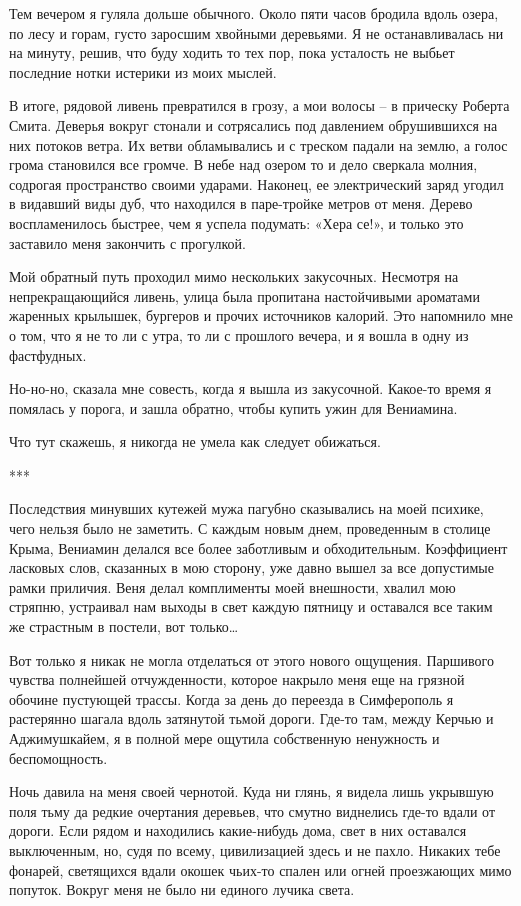 \documentclass[
]{book}
\begin{document}
Тем вечером я гуляла дольше обычного. Около пяти часов бродила вдоль озера, по лесу и горам, густо заросшим хвойными деревьями. Я не останавливалась ни на минуту, решив, что буду ходить то тех пор, пока усталость не выбьет последние нотки истерики из моих мыслей.

В итоге, рядовой ливень превратился в грозу, а мои волосы -- в прическу Роберта Смита. Деверья вокруг стонали и сотрясались под давлением обрушившихся на них потоков ветра. Их ветви обламывались и с треском падали на землю, а голос грома становился все громче. В небе над озером то и дело сверкала молния, содрогая пространство своими ударами. Наконец, ее электрический заряд угодил в видавший виды дуб, что находился в паре-тройке метров от меня. Дерево воспламенилось быстрее, чем я успела подумать: «Хера се!», и только это заставило меня закончить с прогулкой.

Мой обратный путь проходил мимо нескольких закусочных. Несмотря на непрекращающийся ливень, улица была пропитана настойчивыми ароматами жаренных крылышек, бургеров и прочих источников калорий. Это напомнило мне о том, что я не то ли с утра, то ли с прошлого вечера, и я вошла в одну из фастфудных.

Но-но-но, сказала мне совесть, когда я вышла из закусочной. Какое-то время я помялась у порога, и зашла обратно, чтобы купить ужин для Вениамина.

Что тут скажешь, я никогда не умела как следует обижаться.

***

Последствия минувших кутежей мужа пагубно сказывались на моей психике, чего нельзя было не заметить. С каждым новым днем, проведенным в столице Крыма, Вениамин делался все более заботливым и обходительным. Коэффициент ласковых слов, сказанных в мою сторону, уже давно вышел за все допустимые рамки приличия. Веня делал комплименты моей внешности, хвалил мою стряпню, устраивал нам выходы в свет каждую пятницу и оставался все таким же страстным в постели, вот только\ldots{}

Вот только я никак не могла отделаться от этого нового ощущения. Паршивого чувства полнейшей отчужденности, которое накрыло меня еще на грязной обочине пустующей трассы. Когда за день до переезда в Симферополь я растерянно шагала вдоль затянутой тьмой дороги. Где-то там, между Керчью и Аджимушкайем, я в полной мере ощутила собственную ненужность и беспомощность.

Ночь давила на меня своей чернотой. Куда ни глянь, я видела лишь укрывшую поля тьму да редкие очертания деревьев, что смутно виднелись где-то вдали от дороги. Если рядом и находились какие-нибудь дома, свет в них оставался выключенным, но, судя по всему, цивилизацией здесь и не пахло. Никаких тебе фонарей, светящихся вдали окошек чьих-то спален или огней проезжающих мимо попуток. Вокруг меня не было ни единого лучика света.
\end{document}
